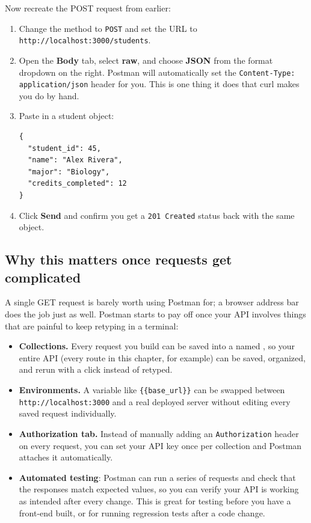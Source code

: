 Now recreate the POST request from earlier:
 
\begin{enumerate}
  \item Change the method to \texttt{POST} and set the URL to
        \texttt{http://localhost:3000/students}.
  \item Open the \textbf{Body} tab, select \textbf{raw}, and choose
        \textbf{JSON} from the format dropdown on the right. Postman will
        automatically set the \texttt{Content-Type: application/json}
        header for you. This is one thing it does that curl makes you
        do by hand.
  \item Paste in a student object:
        \begin{verbatim}
{
  "student_id": 45,
  "name": "Alex Rivera",
  "major": "Biology",
  "credits_completed": 12
}
        \end{verbatim}
  \item Click \textbf{Send} and confirm you get a
        \texttt{201 Created} status back with the same object.
\end{enumerate}
 
\subsection{Why this matters once requests get complicated}
 
A single GET request is barely worth using Postman for; a browser
address bar does the job just as well. Postman starts to pay off once
your API involves things that are painful to keep retyping in a
terminal:
 
\begin{itemize}
  \item \textbf{Collections.} Every request you build can be saved into
        a named , so your entire API (every route in
        this chapter, for example) can be saved, organized, and rerun with
        a click instead of retyped.
  \item \textbf{Environments.} A variable like
        \texttt{\{\{base\_url\}\}} can be swapped between
        \texttt{http://localhost:3000} and a real deployed server without
        editing every saved request individually.
  \item \textbf{Authorization tab.} Instead of manually adding an
        \texttt{Authorization} header on every request, you can set your
        API key once per collection and Postman attaches it automatically.
  \item \textbf{Automated testing}: Postman can run a series of requests and check that the responses
        match expected values, so you can verify your API is working as
        intended after every change. This is great for testing before you have a front-end built, or for running regression tests after a code change.
\end{itemize}
 
